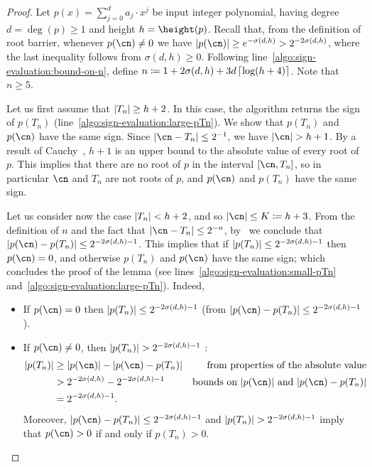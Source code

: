 \LemmaSignPolyRootBarrier*

\begin{proof}
  Let $p(x) = \sum_{j=0}^d a_j \cdot x^j$ be input integer polynomial, having
  degree $d = \deg(p) \geq 1$ and height $h = \height(p)$. Recall that, from the
  definition of root barrier, whenever $p(\cn) \neq 0$ we have $\abs{p(\cn)}
  \geq e^{-\sigma(d,h)} > 2^{-2 \sigma(d,h)}$, where the last inequality
  follows from $\sigma(d,h) \geq 0$. Following
  line~\ref{algo:sign-evaluation:bound-on-n}, define $n \coloneqq 1 +
  2 \sigma(d,h) + 3d\left\lceil\log(h+4)\right\rceil$. 
  Note that $n \geq 5$.

  Let us first assume that $\left|T_n\right| \geq h + 2$. In this case, the algorithm
  returns the sign of $p(T_n)$ (line~\ref{algo:sign-evaluation:large-pTn}). We
  show that $p(T_n)$ and $p(\cn)$ have the same sign. Since $\abs{\cn-T_n}
  \leq 2^{-1}$, we have $\abs{\cn} > h+1$.  
  By a result of Cauchy~\cite[Chapter 8]{Rahman02}, $h+1$ is an upper bound to
  the absolute value of every root of $p$. This implies that there are no root
  of $p$ in the interval $[\cn,T_n]$, so in particular $\cn$ and $T_n$ are
  not roots of $p$, and $p(\cn)$ and $p(T_n)$ have the same sign.
  
  Let us consider now the case $\left|T_n\right| < h + 2$, and so $\abs{\cn} \leq K
  \coloneqq h + 3$. From the definition of $n$ and the fact that $\abs{\cn-T_n}
  \leq 2^{-n}$, by~ we conclude that
  $\abs{p(\cn) - p(T_n)} \leq 2^{-2 \sigma(d,h)-1}$. This implies that if
  $\left|p(T_n)\right| \leq 2^{-2 \sigma(d,h)-1}$ then $p(\cn) = 0$, and
  otherwise $p(T_n)$ and $p(\cn)$ have the same sign;  
  which concludes the proof of the lemma (see
  lines~\ref{algo:sign-evaluation:small-pTn}
  and~\ref{algo:sign-evaluation:large-pTn}). Indeed,  
  \begin{itemize}
    \item If $p(\cn) = 0$ then $\left|p(T_n)\right| \leq 2^{-2 \sigma(d,h)-1}$
    (from $\abs{p(\cn) - p(T_n)} \leq 2^{-2 \sigma(d,h)-1}$).
    \item If $p(\cn) \neq 0$, then $\left|p(T_n)\right| > 2^{-2 \sigma(d,h)-1}$
    :
    \begin{align*}
      \abs{p(T_n)} 
      & \geq \abs{p(\cn)} - \abs{p(\cn) - p(T_n)}
      & \text{from properties of the absolute value}\\
      & > 2^{-2 \sigma(d,h)} - 2^{-2 \sigma(d,h)-1}
      & \text{bounds on $\abs{p(\cn)}$ and $\abs{p(\cn) - p(T_n)}$}\\
      & = 2^{-2 \sigma(d,h)-1}.
    \end{align*}
    Moreover, $\abs{p(\cn) - p(T_n)} \leq 2^{-2 \sigma(d,h)-1}$ and
    $\left|p(T_n)\right| > 2^{-2 \sigma(d,h)-1}$ imply that $p(\cn) > 0$ if and
    only if $p(T_n) > 0$.
    \qedhere
  \end{itemize}
\end{proof}

